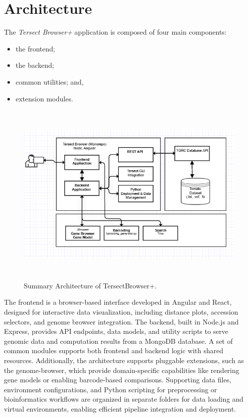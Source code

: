 \documentclass[12pt]{article}
\begin{document}
\section{Architecture}
The \textit{Tersect Browser+} application is composed of four main components: 
\begin{itemize}
    \item the frontend; 
    \item the backend; 
    \item common utilities; and, 
    \item extension modules.
\end{itemize} 

\begin{figure}[h]
    \centering
    \includegraphics[width=15cm, height=9cm]{high_level_arch_draft.png}
    \caption{Summary Architecture of TersectBrowser+.}
\end{figure}


The frontend is a browser-based interface developed in Angular and React, designed for interactive data visualization, including distance plots, accession selectors, and genome browser integration. The backend, built in Node.js and Express, provides API endpoints, data models, and utility scripts to serve genomic data and computation results from a MongoDB database. A set of common modules supports both frontend and backend logic with shared resources. Additionally, the architecture supports pluggable extensions, such as the genome-browser, which provide domain-specific capabilities like rendering gene models or enabling barcode-based comparisons. Supporting data files, environment configurations, and Python scripting for preprocessing or bioinformatics workflows are organized in separate folders for data loading and virtual environments, enabling efficient pipeline integration and deployment.
\end{document}
